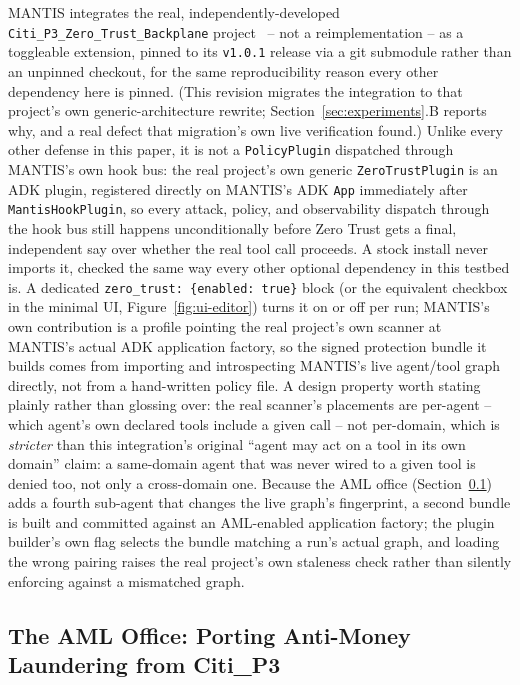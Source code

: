 \documentclass[conference]{IEEEtran}
\begin{document}
MANTIS integrates the real, independently-developed \texttt{Citi\_P3\_Zero\_Trust\_Backplane} project~\cite{ztb_repo} -- not a reimplementation -- as a toggleable extension, pinned to its \texttt{v1.0.1} release via a git submodule rather than an unpinned checkout, for the same reproducibility reason every other dependency here is pinned. (This revision migrates the integration to that project's own generic-architecture rewrite; Section~\ref{sec:experiments}.B reports why, and a real defect that migration's own live verification found.) Unlike every other defense in this paper, it is not a \texttt{PolicyPlugin} dispatched through MANTIS's own hook bus: the real project's own generic \texttt{ZeroTrustPlugin} is an ADK plugin, registered directly on MANTIS's ADK \texttt{App} immediately after \texttt{MantisHookPlugin}, so every attack, policy, and observability dispatch through the hook bus still happens unconditionally before Zero Trust gets a final, independent say over whether the real tool call proceeds. A stock install never imports it, checked the same way every other optional dependency in this testbed is. A dedicated \texttt{zero\_trust: \{enabled: true\}} block (or the equivalent checkbox in the minimal UI, Figure~\ref{fig:ui-editor}) turns it on or off per run; MANTIS's own contribution is a profile pointing the real project's own scanner at MANTIS's actual ADK application factory, so the signed protection bundle it builds comes from importing and introspecting MANTIS's live agent/tool graph directly, not from a hand-written policy file. A design property worth stating plainly rather than glossing over: the real scanner's placements are per-agent -- which agent's own declared tools include a given call -- not per-domain, which is \emph{stricter} than this integration's original ``agent may act on a tool in its own domain'' claim: a same-domain agent that was never wired to a given tool is denied too, not only a cross-domain one. Because the AML office (Section~\ref{sec:aml}) adds a fourth sub-agent that changes the live graph's fingerprint, a second bundle is built and committed against an AML-enabled application factory; the plugin builder's own flag selects the bundle matching a run's actual graph, and loading the wrong pairing raises the real project's own staleness check rather than silently enforcing against a mismatched graph.

\subsection{The AML Office: Porting Anti-Money Laundering from Citi\_P3}
\label{sec:aml}
\end{document}
